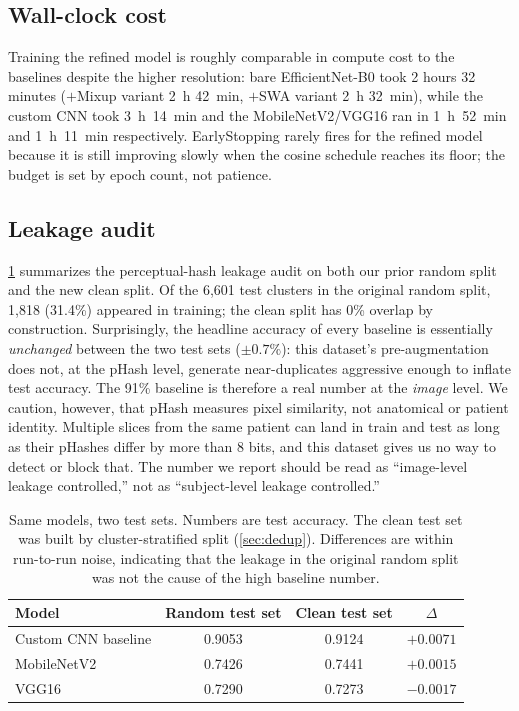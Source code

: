 \documentclass[journal,onecolumn,11pt]{IEEEtran}
\begin{document}
\subsection{Wall-clock cost}

Training the refined model is roughly comparable in compute cost to the
baselines despite the higher resolution: bare EfficientNet-B0 took
2 hours 32 minutes ($+$Mixup variant 2~h 42~min, $+$SWA variant 2~h 32~min),
while the custom CNN took 3~h~14~min and the MobileNetV2/VGG16 ran in
1~h~52~min and 1~h~11~min respectively. EarlyStopping rarely fires for
the refined model because it is still improving slowly when the cosine
schedule reaches its floor; the budget is set by epoch count, not patience.

\subsection{Leakage audit}
\label{sec:leakage_audit}

\cref{tab:leakage_audit} summarizes the perceptual-hash leakage audit on
both our prior random split and the new clean split. Of the 6{,}601 test
clusters in the original random split, 1{,}818 (31.4\%) appeared in
training; the clean split has 0\% overlap by construction. Surprisingly,
the headline accuracy of every baseline is essentially \emph{unchanged}
between the two test sets ($\pm 0.7\%$): this dataset's pre-augmentation
does not, at the pHash level, generate near-duplicates aggressive enough
to inflate test accuracy. The 91\% baseline is therefore a real number at
the \emph{image} level. We caution, however, that pHash measures pixel
similarity, not anatomical or patient identity. Multiple slices from the
same patient can land in train and test as long as their pHashes differ
by more than 8 bits, and this dataset gives us no way to detect or block
that. The number we report should be read as ``image-level leakage
controlled,'' not as ``subject-level leakage controlled.''

\begin{table}[t]
  \centering
  \small
  \caption{Same models, two test sets. Numbers are test accuracy. The clean
  test set was built by cluster-stratified split (\cref{sec:dedup}).
  Differences are within run-to-run noise, indicating that the
  leakage in the original random split was not the cause of the high
  baseline number.}
  \label{tab:leakage_audit}
  \begin{tabular}{l@{\hskip 12pt}c@{\hskip 12pt}c@{\hskip 12pt}c}
    \toprule
    \textbf{Model} & \textbf{Random test set} & \textbf{Clean test set} & \textbf{$\Delta$} \\
    \midrule
    Custom CNN baseline   & 0.9053 & 0.9124 & $+0.0071$ \\
    MobileNetV2           & 0.7426 & 0.7441 & $+0.0015$ \\
    VGG16                 & 0.7290 & 0.7273 & $-0.0017$ \\
    \bottomrule
  \end{tabular}
\end{table}
\end{document}
